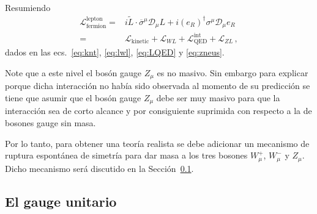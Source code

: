 Resumiendo
\begin{align}
  \label{eq:fermlep}
  \mathcal{L}_{\text{fermion}}^{\text{lepton}}=& i \widetilde{L}\cdot\overline{\sigma}^\mu\mathcal{D}_\mu L+  i \left( e_R \right)^{\dagger}{\sigma}^\mu\mathcal{D}_\mu e_R \nonumber\\
 =&\mathcal{L}_{\text{kinetic}}+
\mathcal{L}_{WL}+\mathcal{L}^{\text{int}}_{\text{QED}}+ \mathcal{L}_{ZL}\,,
\end{align}
dados en las ecs.~\eqref{eq:knt}, \eqref{eq:lwl}, \eqref{eq:LQED} y \eqref{eq:zneus}.


Note que a este nivel el bosón gauge $Z_{\mu}$ es no masivo. Sin embargo para explicar porque dicha interacción no había sido observada al momento de su predicción se tiene que asumir que el bosón gauge $Z_{\mu}$ debe ser muy masivo para que la interacción sea de corto alcance y por consiguiente suprimida con respecto a la de bosones gauge sin masa. 

Por lo tanto, para obtener una teoría realista se debe adicionar un mecanismo de ruptura espontánea de simetría para dar masa a los tres bosones $W_{\mu}^{+}$, $W_{\mu}^{-}$ y $Z_{\mu}$. Dicho mecanismo será discutido en la Sección~\ref{sec:el-gauge-unitario}.



\subsection{El gauge unitario}
\label{sec:el-gauge-unitario}

